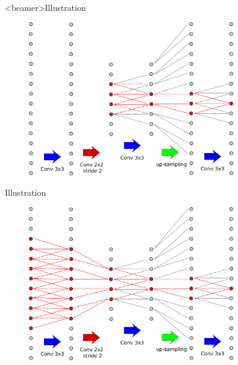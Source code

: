 \documentclass[xcolor=pdftex,dvipsnames,table,mathserif]{beamer}
\begin{document}
\begin{frame}<beamer>{Illustration}

  \begin{figure}
  \includegraphics[width=0.8\textwidth]{receptive_field2.png}
  \end{figure}

\end{frame}

\begin{frame}{Illustration}

  \begin{figure}
  \includegraphics[width=0.8\textwidth]{receptive_field3.png}
  \end{figure}

\end{frame}
\end{document}
